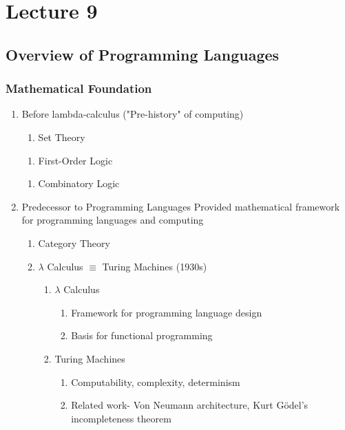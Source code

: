 \chapter{Lecture 9}

\newcommand\bigfrac[2]{%
  \begin{array}{c}
    #1 \\
    \hline
    #2
  \end{array}}

\section{Overview of Programming Languages}

\subsection{Mathematical Foundation}
\begin{enumerate}
	\item Before lambda-calculus ("Pre-history" of computing)
	
	\begin{enumerate}
		\item Set Theory
	\end{enumerate}
	\begin{enumerate}
		\item First-Order Logic
	\end{enumerate}
	\begin{enumerate}
		\item Combinatory Logic
	\end{enumerate}
	
	\item Predecessor to Programming Languages \newline
	Provided mathematical framework for programming languages and computing
	
	\begin{enumerate}
		\item Category Theory
		\item $\lambda$ Calculus $\equiv$ Turing Machines (1930s)
		\begin{enumerate}
			\item $\lambda$ Calculus
			\begin{enumerate}
				\item Framework for programming language design
				\item Basis for functional programming
			\end{enumerate}
			\item Turing Machines
			\begin{enumerate}
				\item Computability, complexity, determinism
				\item Related work- Von Neumann architecture, Kurt Gödel's incompleteness theorem
			\end{enumerate}
		\end{enumerate}
	\end{enumerate}
	
\end{enumerate}

